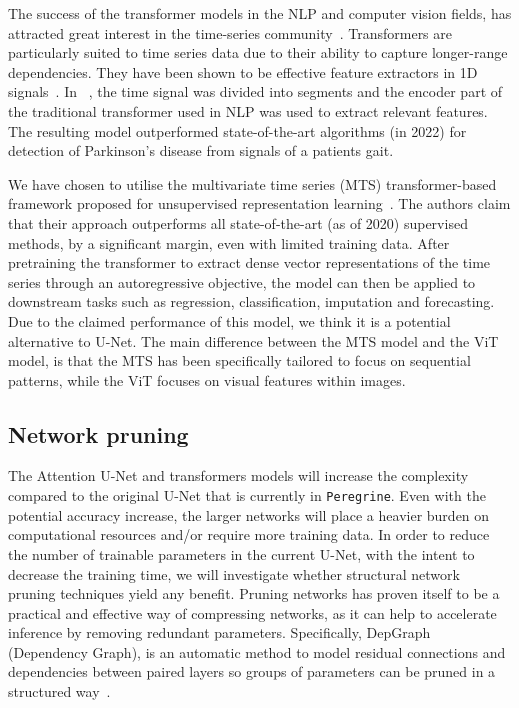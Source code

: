 The success of the transformer models in the NLP and computer vision fields, has attracted great interest in the time-series community~\cite{Wen_Zhou_Zhang_Chen_Ma_Yan_Sun_2023}. Transformers are particularly suited to time series data due to their ability to capture longer-range dependencies. They have been shown to be effective feature extractors in 1D signals~\cite{Nguyen_Miah_Bilodeau_Bouachir_2022}. In ~\cite{Nguyen_Miah_Bilodeau_Bouachir_2022}, the time signal was divided into segments and the encoder part of the traditional transformer used in NLP was used to extract relevant features. The resulting model outperformed state-of-the-art algorithms (in 2022) for detection of Parkinson's disease from signals of a patients gait. 

We have chosen to utilise the multivariate time series (MTS) transformer-based framework proposed for unsupervised representation learning~\cite{Zerveas_2020_mvts}. The authors claim that their approach outperforms all state-of-the-art (as of 2020) supervised methods, by a significant margin, even with limited training data. After pretraining the transformer to extract dense vector representations of the time series through an autoregressive objective, the model can then be applied to downstream tasks such as regression, classification, imputation and forecasting. Due to the claimed performance of this model, we think it is a potential alternative to U-Net. The main difference between the MTS model and the ViT model, is that the MTS has been specifically tailored to focus on sequential patterns, while the ViT focuses on visual features within images.

\subsection{Network pruning}

The Attention U-Net and transformers models will increase the complexity compared to the original U-Net that is currently in \texttt{Peregrine}. Even with the potential accuracy increase, the larger networks will place a heavier burden on computational resources and/or require more training data. In order to reduce the number of trainable parameters in the current U-Net, with the intent to decrease the training time, we will investigate whether structural network pruning techniques yield any benefit. Pruning networks has proven itself to be a practical and effective way of compressing networks, as it can help to accelerate inference by removing redundant parameters. Specifically, DepGraph (Dependency Graph), is an automatic method to model residual connections and dependencies between paired layers so groups of parameters can be pruned in a structured way~\cite{Fang_Ma_Song_Mi_Wang_2023}.
